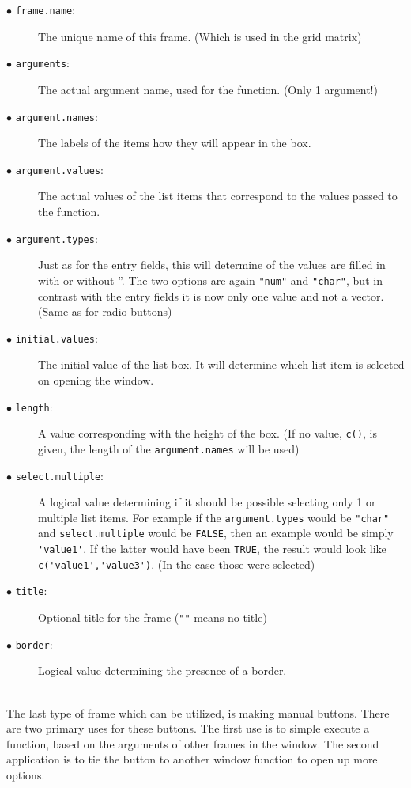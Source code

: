 \documentclass[a4paper]{article}\usepackage[]{graphicx}\usepackage[]{color}
\begin{document}
\begin{description}
  \item[$\bullet$ \texttt{frame.name}:] The unique name of this frame. (Which is used in the grid matrix)
  \item[$\bullet$ \texttt{arguments}:] The actual argument name, used for the
  function. (Only 1 argument!)
  \item[$\bullet$ \texttt{argument.names}:] The labels of the items how they
  will appear in the box.
  \item[$\bullet$ \texttt{argument.values}:] The actual values of the list items 
  that correspond to the values passed to the function. 
  \item[$\bullet$ \texttt{argument.types}:] Just as for the entry fields, this
  will determine of the values are filled in with or without ''. The two options
  are again \verb|"num"| and \verb|"char"|, but in contrast with the entry
  fields it is now only one value and not a vector. (Same as for radio buttons)
  \item[$\bullet$ \texttt{initial.values}:] The initial value of the list box.
  It will determine which list item is selected on opening the window.
  \item[$\bullet$ \texttt{length}:] A value corresponding with the height of the
  box. (If no value, \verb|c()|, is given, the length of the \verb|argument.names| will be used)
  \item[$\bullet$ \texttt{select.multiple}:] A logical value determining if it
  should be possible selecting only 1 or multiple list items. For example if the
  \verb|argument.types| would be \verb|"char"| and \verb|select.multiple| would
  be \verb|FALSE|, then an example would be simply \verb|'value1'|. If the
  latter would have been \verb|TRUE|, the result would look like
  \verb|c('value1','value3')|. (In the case those were selected)
  \item[$\bullet$ \texttt{title}:] Optional title for the frame (\verb|""| means
  no title)
  \item[$\bullet$ \texttt{border}:] Logical value determining the presence of a
  border.   
\end{description}


\\
The last type of frame which can be utilized, is making manual buttons. There
are two primary uses for these buttons. The first use is to simple execute a
function, based on the arguments of other frames in the window. The second
application is to tie the button to another window function to open up more options.
\end{document}
